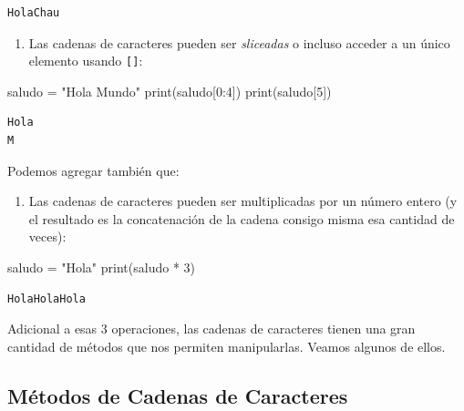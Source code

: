 \documentclass[
  letterpaper,
  DIV=11,
  numbers=noendperiod]{scrreprt}
\newenvironment{Shaded}{\begin{snugshade}}{\end{snugshade}}
\newcommand{\BuiltInTok}[1]{\textcolor[rgb]{0.00,0.23,0.31}{#1}}
\newcommand{\DecValTok}[1]{\textcolor[rgb]{0.68,0.00,0.00}{#1}}
\newcommand{\NormalTok}[1]{\textcolor[rgb]{0.00,0.23,0.31}{#1}}
\newcommand{\OperatorTok}[1]{\textcolor[rgb]{0.37,0.37,0.37}{#1}}
\newcommand{\StringTok}[1]{\textcolor[rgb]{0.13,0.47,0.30}{#1}}
\providecommand{\tightlist}{%
  \setlength{\itemsep}{0pt}\setlength{\parskip}{0pt}}\usepackage{longtable,booktabs,array}
\begin{document}
\begin{verbatim}
HolaChau
\end{verbatim}

\begin{enumerate}
\def\labelenumi{\arabic{enumi}.}
\setcounter{enumi}{1}
\tightlist
\item
  Las cadenas de caracteres pueden ser \emph{sliceadas} o incluso
  acceder a un único elemento usando \texttt{{[}{]}}:
\end{enumerate}

\begin{Shaded}
\begin{Highlighting}[]
\NormalTok{saludo }\OperatorTok{=} \StringTok{"Hola Mundo"}
\BuiltInTok{print}\NormalTok{(saludo[}\DecValTok{0}\NormalTok{:}\DecValTok{4}\NormalTok{])}
\BuiltInTok{print}\NormalTok{(saludo[}\DecValTok{5}\NormalTok{])}
\end{Highlighting}
\end{Shaded}

\begin{verbatim}
Hola
M
\end{verbatim}

Podemos agregar también que:

\begin{enumerate}
\def\labelenumi{\arabic{enumi}.}
\setcounter{enumi}{2}
\tightlist
\item
  Las cadenas de caracteres pueden ser multiplicadas por un número
  entero (y el resultado es la concatenación de la cadena consigo misma
  esa cantidad de veces):
\end{enumerate}

\begin{Shaded}
\begin{Highlighting}[]
\NormalTok{saludo }\OperatorTok{=} \StringTok{"Hola"}
\BuiltInTok{print}\NormalTok{(saludo }\OperatorTok{*} \DecValTok{3}\NormalTok{)}
\end{Highlighting}
\end{Shaded}

\begin{verbatim}
HolaHolaHola
\end{verbatim}

Adicional a esas 3 operaciones, las cadenas de caracteres tienen una
gran cantidad de métodos que nos permiten manipularlas. Veamos algunos
de ellos.

\hypertarget{muxe9todos-de-cadenas-de-caracteres}{%
\subsection{Métodos de Cadenas de
Caracteres}\label{muxe9todos-de-cadenas-de-caracteres}}
\end{document}
